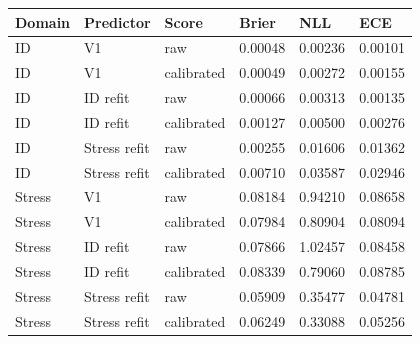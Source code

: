\begin{tabular}{llllll}
\toprule
Domain & Predictor & Score & Brier & NLL & ECE \\
\midrule
ID & V1 & raw & 0.00048 & 0.00236 & 0.00101 \\
ID & V1 & calibrated & 0.00049 & 0.00272 & 0.00155 \\
ID & ID refit & raw & 0.00066 & 0.00313 & 0.00135 \\
ID & ID refit & calibrated & 0.00127 & 0.00500 & 0.00276 \\
ID & Stress refit & raw & 0.00255 & 0.01606 & 0.01362 \\
ID & Stress refit & calibrated & 0.00710 & 0.03587 & 0.02946 \\
Stress & V1 & raw & 0.08184 & 0.94210 & 0.08658 \\
Stress & V1 & calibrated & 0.07984 & 0.80904 & 0.08094 \\
Stress & ID refit & raw & 0.07866 & 1.02457 & 0.08458 \\
Stress & ID refit & calibrated & 0.08339 & 0.79060 & 0.08785 \\
Stress & Stress refit & raw & 0.05909 & 0.35477 & 0.04781 \\
Stress & Stress refit & calibrated & 0.06249 & 0.33088 & 0.05256 \\
\bottomrule
\end{tabular}
